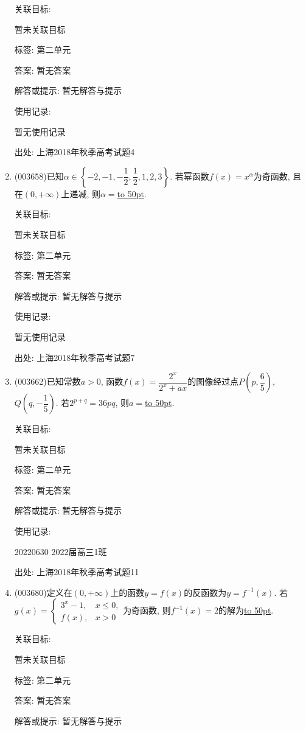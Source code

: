 \documentclass[10pt,a4paper]{article}
\newcommand{\blank}[1]{\underline{\hbox to #1pt{}}}
\begin{document}
\begin{enumerate}[1.]
关联目标:

暂未关联目标



标签: 第二单元

答案: 暂无答案

解答或提示: 暂无解答与提示

使用记录:

暂无使用记录


出处: 上海2018年秋季高考试题4
\item { (003658)}已知$\alpha\in \left\{-2,-1,-\dfrac{1}{2},\dfrac{1}{2},1,2,3\right\}$. 若幂函数$f(x)=x^{\alpha}$为奇函数, 且在$(0,+\infty)$上递减, 则$\alpha=$\blank{50}.


关联目标:

暂未关联目标



标签: 第二单元

答案: 暂无答案

解答或提示: 暂无解答与提示

使用记录:

暂无使用记录


出处: 上海2018年秋季高考试题7
\item { (003662)}已知常数$a>0$, 函数$f(x)=\dfrac{2^x}{2^x+ax}$的图像经过点$P\left(p,\dfrac{6}{5}\right)$, $Q\left(q,-\dfrac{1}{5}\right)$. 若$2^{p+q}=36pq$, 则$a=$\blank{50}.


关联目标:

暂未关联目标



标签: 第二单元

答案: 暂无答案

解答或提示: 暂无解答与提示

使用记录:

20220630	2022届高三1班	


出处: 上海2018年秋季高考试题11
\item { (003680)}定义在$(0,+\infty)$上的函数$y=f(x)$的反函数为$y=f^{-1}(x)$. 若$g(x)=\begin{cases}3^x-1, & x\le 0,\\ f(x), & x>0\end{cases}$为奇函数, 则$f^{-1}(x)=2$的解为\blank{50}.


关联目标:

暂未关联目标



标签: 第二单元

答案: 暂无答案

解答或提示: 暂无解答与提示


\end{enumerate}
\end{document}
